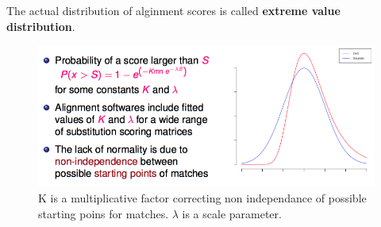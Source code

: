 The actual distribution of alginment scores is called \textbf{extreme value distribution}.

\begin{figure}[htp]
	\centering
	\includegraphics[scale=0.5]{images/16_evd.png}
	\caption{K is a multiplicative factor correcting non independance of possible starting poins for matches. $\lambda$ is a scale parameter.}
\end{figure}